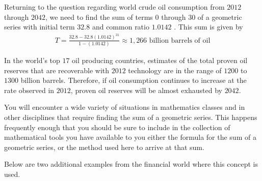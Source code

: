 \documentclass[10pt,]{book}
\theoremstyle{ptxdefinitionnotitle}
\theoremstyle{ptxdefinitiontitle}
\theoremstyle{ptxdefinitionnotitle}
\theoremstyle{ptxdefinitiontitle}
\theoremstyle{ptxdefinitionnotitle}
\theoremstyle{ptxdefinitiontitle}
\numberwithin{equation}{section}
\begin{document}
Returning to the question regarding world crude oil consumption from \(2012\) through \(2042\), we need to find the sum of terms \(0\) through \(30\) of a geometric series with initial term \(32.8\) and common ratio \(1.0142\) .  This sum is given by%
\begin{gather*}
T = \frac{32.8-32.8(1.0142)^{31}}{1-(1.0142)} \approx 1,266 \text{ billion barrels of oil} 
\end{gather*}
%
\par
\hypertarget{p-149}{}%
In the world’s top \(17\) oil producing countries, estimates of the total proven oil reserves that are recoverable with \(2012\) technology are in the range of \(1200\) to \(1300\) billion barrels.  Therefore, if oil consumption continues to increase at the rate observed in \(2012\), proven oil reserves will be almost exhausted by \(2042\).%
\par
\hypertarget{p-150}{}%
You will encounter a wide variety of situations in mathematics classes and in other disciplines that require finding the sum of a geometric series. This happens frequently enough that you should be sure to include in the collection of mathematical tools you have available to you either the formula for the sum of a geometric series, or the method used here to arrive at that sum.%
\par
\hypertarget{p-151}{}%
Below are two additional examples from the financial world where this concept is used.%
\end{document}
